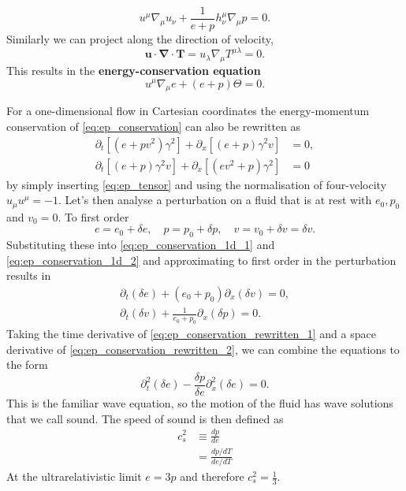 \cite[eq. 3.55]{rezzolla_relativistic_2013}
\begin{equation}
u^\mu \nabla_\mu u_\nu + \frac{1}{e+p} h^\mu_\nu \nabla_\mu p = 0.
\end{equation}
Similarly we can project along the direction of velocity,
\begin{equation}
\bm{u} \cdot \bm{\nabla} \cdot \bm{T} = u_\lambda \nabla_\mu T^{\mu\lambda} = 0.
\end{equation}
This results in the \textbf{energy-conservation equation}
\cite[eq. 3.57]{rezzolla_relativistic_2013}
\begin{equation}
u^\mu \nabla_\mu e + (e+p) \Theta = 0.
\end{equation}

For a one-dimensional flow in Cartesian coordinates the energy-momentum conservation of \eqref{eq:ep_conservation} can also be rewritten as
\begin{align}
\partial_t \left[ (e+pv^2) \gamma^2 \right] + \partial_x \left[ (e+p) \gamma^2 v \right] &= 0,
\label{eq:ep_conservation_1d_1} \\
\partial_t \left[ (e+p) \gamma^2 v \right] + \partial_x \left[ (ev^2 + p) \gamma^2 \right] &= 0
\label{eq:ep_conservation_1d_2}
\end{align}
by simply inserting \eqref{eq:ep_tensor} and using the normalisation of four-velocity $u_\mu u^\mu = -1$.
Let's then analyse a perturbation on a fluid that is at rest with $e_0, p_0$ and $v_0 = 0$.
To first order
\begin{equation}
e = e_0 + \delta e, \quad p=p_0 + \delta p, \quad v = v_0 + \delta v = \delta v.
\end{equation}
Substituting these into \eqref{eq:ep_conservation_1d_1} and \eqref{eq:ep_conservation_1d_2} and approximating to first order in the perturbation results in
\begin{align}
\partial_t (\delta e) + (e_0 + p_0) \partial_x (\delta v) = 0,
\label{eq:ep_conservation_rewritten_1} \\
\partial_t (\delta v) + \frac{1}{e_0 + p_0} \partial_x (\delta p) = 0.
\label{eq:ep_conservation_rewritten_2}
\end{align}
Taking the time derivative of \eqref{eq:ep_conservation_rewritten_1} and a space derivative of \eqref{eq:ep_conservation_rewritten_2}, we can combine the equations to the form
\begin{equation}
\partial_t^2 (\delta e) - \frac{\delta p}{\delta e} \partial_x^2(\delta e) = 0.
\end{equation}
This is the familiar wave equation, so the motion of the fluid has wave solutions that we call sound.
\cites[ch. 4.3]{rezzolla_relativistic_2013}[ch. 7.4]{lecture_notes}
The speed of sound is then defined as
\cites[eq. 2.168]{rezzolla_relativistic_2013}[eq. 13]{giese_2020}[eq. 3]{giese_2021}
\begin{align}
c_s^2
&\equiv \frac{dp}{de} \\
&= \frac{dp/dT}{de/dT}
\end{align}
At the ultrarelativistic limit $e=3p$ and therefore $c_s^2=\frac{1}{3}$.

